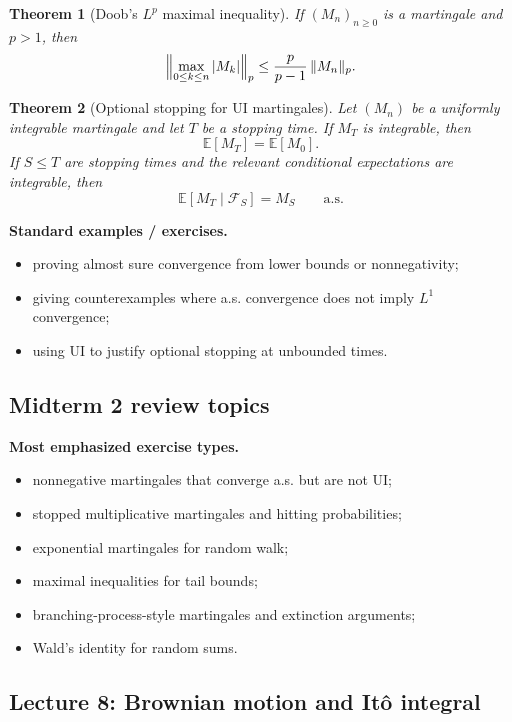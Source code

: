 \documentclass[11pt]{article}
\newtheorem{theorem}{Theorem}[section]
\theoremstyle{definition}
\begin{document}
\begin{theorem}[Doob's $L^p$ maximal inequality]
If $(M_n)_{n\ge 0}$ is a martingale and $p>1$, then
\[
\Bigl\|\max_{0\le k\le n}|M_k|\Bigr\|_p
\le \frac{p}{p-1}\,\|M_n\|_p.
\]
\end{theorem}

\begin{theorem}[Optional stopping for UI martingales]
Let $(M_n)$ be a uniformly integrable martingale and let $T$ be a stopping time. If $M_T$ is integrable, then
\[
\mathbb E[M_T]=\mathbb E[M_0].
\]
If $S\le T$ are stopping times and the relevant conditional expectations are integrable, then
\[
\mathbb E[M_T\mid \mathcal F_S]=M_S
\qquad \text{a.s.}
\]
\end{theorem}

\textbf{Standard examples / exercises.}
\begin{itemize}[leftmargin=2em]
    \item proving almost sure convergence from lower bounds or nonnegativity;
    \item giving counterexamples where a.s. convergence does not imply $L^1$ convergence;
    \item using UI to justify optional stopping at unbounded times.
\end{itemize}

\subsection{Midterm 2 review topics}
\textbf{Most emphasized exercise types.}
\begin{itemize}[leftmargin=2em]
    \item nonnegative martingales that converge a.s. but are not UI;
    \item stopped multiplicative martingales and hitting probabilities;
    \item exponential martingales for random walk;
    \item maximal inequalities for tail bounds;
    \item branching-process-style martingales and extinction arguments;
    \item Wald's identity for random sums.
\end{itemize}

\subsection{Lecture 8: Brownian motion and It\^o integral}
\end{document}
